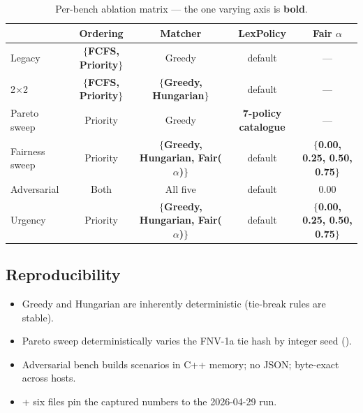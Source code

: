 \begin{table}[H]
\centering
\footnotesize
\setlength{\tabcolsep}{4pt}
\caption{Per-bench ablation matrix --- the one varying axis is \textbf{bold}.}
\label{tab:ablation_matrix}
\begin{tabular}{l c c c c}
\toprule
& \textbf{Ordering} & \textbf{Matcher} & \textbf{LexPolicy} & \textbf{Fair $\alpha$} \\
\midrule
Legacy            & \textbf{$\{$FCFS, Priority$\}$} & Greedy   & default  & --- \\
2$\times$2        & \textbf{$\{$FCFS, Priority$\}$} & \textbf{$\{$Greedy, Hungarian$\}$} & default  & --- \\
Pareto sweep      & Priority & Greedy   & \textbf{7-policy catalogue} & --- \\
Fairness sweep    & Priority & \textbf{$\{$Greedy, Hungarian, Fair($\alpha$)$\}$} & default  & \textbf{$\{$0.00, 0.25, 0.50, 0.75$\}$} \\
Adversarial       & Both     & All five  & default  & 0.00 \\
Urgency           & Priority & \textbf{$\{$Greedy, Hungarian, Fair($\alpha$)$\}$} & default  & \textbf{$\{$0.00, 0.25, 0.50, 0.75$\}$} \\
\bottomrule
\end{tabular}
\end{table}

\subsection{Reproducibility}

\begin{itemize}
  \item Greedy and Hungarian are inherently deterministic (tie-break
        rules are stable).
  \item Pareto sweep deterministically varies the FNV-1a tie hash
        by integer seed ().
  \item Adversarial bench builds scenarios in C++ memory; no JSON;
        byte-exact across hosts.
  \item {} + six  files
        pin the captured numbers to the 2026-04-29 run.
\end{itemize}
